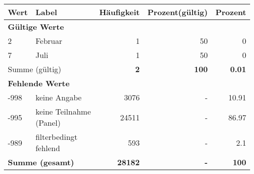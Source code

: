     \begin{longtable}{lXrrr}
     \toprule
     \textbf{Wert} & \textbf{Label} & \textbf{Häufigkeit} & \textbf{Prozent(gültig)} & \textbf{Prozent} \\
     \endhead
     \midrule
     \multicolumn{5}{l}{\textbf{Gültige Werte}}\\

     2 &
     \multicolumn{1}{X}{ Februar   } &


       \num{1} &
       \num[round-mode=places,round-precision=2]{50} &
         \num[round-mode=places,round-precision=2]{0} \\

     7 &
     \multicolumn{1}{X}{ Juli   } &


       \num{1} &
       \num[round-mode=places,round-precision=2]{50} &
         \num[round-mode=places,round-precision=2]{0} \\
     \midrule
     \multicolumn{2}{l}{Summe (gültig)} &
       \textbf{\num{2}} &
     \textbf{\num{100}} &
       \textbf{\num[round-mode=places,round-precision=2]{0.01}} \\
     \multicolumn{5}{l}{\textbf{Fehlende Werte}}\\
       -998 &
       keine Angabe &
         \num{3076} &
        - &
         \num[round-mode=places,round-precision=2]{10.91} \\
       -995 &
       keine Teilnahme (Panel) &
         \num{24511} &
        - &
         \num[round-mode=places,round-precision=2]{86.97} \\
       -989 &
       filterbedingt fehlend &
         \num{593} &
        - &
         \num[round-mode=places,round-precision=2]{2.1} \\
     \midrule
     \multicolumn{2}{l}{\textbf{Summe (gesamt)}} &
          \textbf{\num{28182}} &
        \textbf{-} &
        \textbf{\num{100}} \\
     \bottomrule
     \end{longtable}
     
